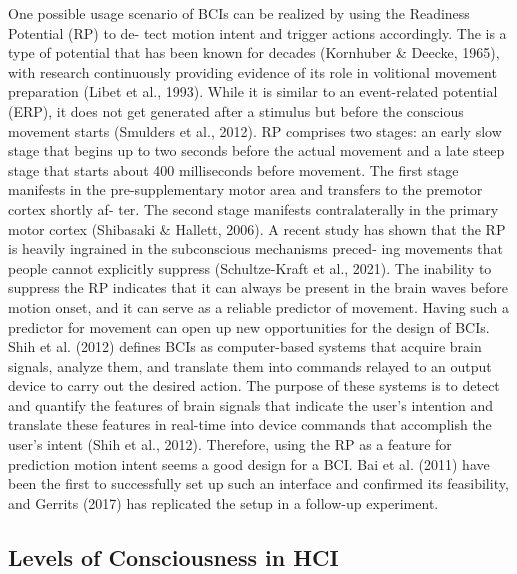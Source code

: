 One possible usage scenario of BCIs can be realized by using the Readiness Potential (RP) to de- tect motion intent and trigger actions accordingly. The is a type of potential that has been known for decades (Kornhuber & Deecke, 1965), with research continuously providing evidence of its role in volitional movement preparation (Libet et al., 1993). While it is similar to an event-related potential (ERP), it does not get generated after a stimulus but before the conscious movement starts (Smulders et al., 2012). RP comprises two stages: an early slow stage that begins up to two seconds before the actual movement and a late steep stage that starts about 400 milliseconds before movement. The first stage manifests in the pre-supplementary motor area and transfers to the premotor cortex shortly af- ter. The second stage manifests contralaterally in the primary motor cortex (Shibasaki & Hallett, 2006).
A recent study has shown that the RP is heavily ingrained in the subconscious mechanisms preced- ing movements that people cannot explicitly suppress (Schultze-Kraft et al., 2021). The inability to suppress the RP indicates that it can always be present in the brain waves before motion onset, and it can serve as a reliable predictor of movement.
Having such a predictor for movement can open up new opportunities for the design of BCIs. Shih et al. (2012) defines BCIs as computer-based systems that acquire brain signals, analyze them, and translate them into commands relayed to an output device to carry out the desired action. The purpose of these systems is to detect and quantify the features of brain signals that indicate the user’s intention and translate these features in real-time into device commands that accomplish the user’s intent (Shih et al., 2012). Therefore, using the RP as a feature for prediction motion intent seems a good design for a BCI. Bai et al. (2011) have been the first to successfully set up such an interface and confirmed its feasibility, and Gerrits (2017) has replicated the setup in a follow-up experiment.

\subsection{Levels of Consciousness in HCI}

